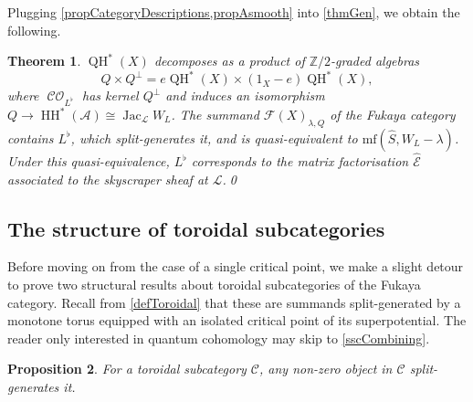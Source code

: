 \documentclass[JEP,XML,SOM,Unicode,NoEqCountersInSection,NoFloatCountersInSection,published]{cedram}
\newtheorem{theorem}{Theorem}[section]
\newtheorem{proposition}[theorem]{Proposition}
\theoremstyle{definition}
\newcommand{\ZZ}{\mathbb{Z}}
\newcommand{\LL}{L^\flat}
\newcommand{\hatS}{\widehat{S}}
\newcommand{\hatE}{\widehat{\calE}}
\newcommand{\calA}{\mathcal{A}}
\newcommand{\calC}{\mathcal{C}}
\newcommand{\calE}{\mathcal{E}}
\newcommand{\calL}{\mathcal{L}}
\newcommand{\Fuk}{\mathcal{F}}
\newcommand{\mf}{\mathrm{mf}}
\newcommand{\HH}{\operatorname{HH}}
\newcommand{\CO}{\operatorname{\mathcal{CO}}}
\newcommand{\QH}{\operatorname{QH}}
\newcommand{\Jac}{\operatorname{Jac}}
\begin{document}
Plugging \cref{propCategoryDescriptions,propAsmooth} into \cref{thmGen}, we obtain the following.

\begin{theorem}
\label{thmSingle}
$\QH^*(X)$ decomposes as a product of $\ZZ/2$-graded algebras
\[
Q \times Q^\perp = e \QH^*(X) \times (1_X-e) \QH^*(X),
\]
where $\CO_{\LL}$ has kernel $Q^\perp$ and induces an isomorphism $Q \to \HH^*(\calA) \cong \Jac_\calL W_L$. The summand $\Fuk(X)_{\lambda, Q}$ of the Fukaya category contains $\LL$, which split-generates it, and is quasi-equivalent to $\mf (\hatS, W_L - \lambda)$. Under this quasi-equivalence, $\LL$ corresponds to the matrix factorisation $\hatE$ associated to the skyscraper sheaf at $\calL$.\qed
\end{theorem}

\subsection{The structure of toroidal subcategories}
\label{sscToroidal}

Before moving on from the case of a single critical point, we make a slight detour to prove two structural results about toroidal subcategories of the Fukaya category. Recall from \cref{defToroidal} that these are summands split-generated by a monotone torus equipped with an isolated critical point of its superpotential. The reader only interested in quantum cohomology may skip to \cref{sscCombining}.

\begin{proposition}
\label{propSegal}
For a toroidal subcategory $\calC$, any non-zero object in $\calC$ split-generates it.
\end{proposition}
\end{document}
